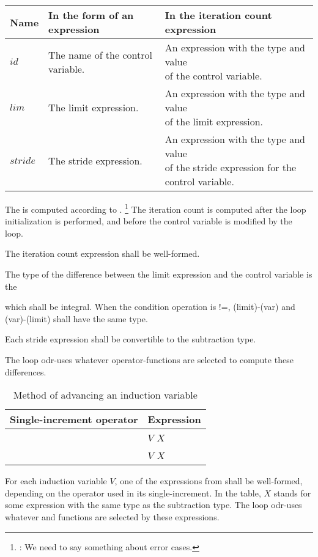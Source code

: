 \begin{table}[ht]
\begin{tabular}{|l|l|l|}
\hline
\bfseries Name&
\bfseries In the form of an expression&
\bfseries In the iteration count expression
\\ \hline
$id$&
The name of the control variable.&
\parbox[c][30pt]{2.5in}{
An expression with the type and value\\
of the control variable.
}
\\ \hline
$lim$&
The limit expression.&
\parbox[c][30pt]{2.5in}{
An expression with the type and value\\
of the limit expression.
}
\\ \hline
$stride$&
The stride expression.&
\parbox[c][40pt]{2.5in}{
An expression with the type and value\\
of the stride expression
for the control variable.
}
\\ \hline
\end{tabular}
\end{table}

\pnum
The
is computed according to
.%
\footnote{:
We need to say something about error cases.
}
The iteration count is computed after the loop initialization is performed,
and before the control variable is modified by the loop.
\begin{cpp}
The iteration count expression shall be well-formed.
\end{cpp}

\pnum
The type of the difference between the limit expression and the control variable
is the
%
\yescpp{,}
\begin{cpp}
which shall be integral.
When the condition operation is !=,
(limit)-(var) and (var)-(limit) shall have the same type.
\end{cpp}
Each stride expression shall be convertible to the subtraction type.
\begin{cpp}
The loop odr-uses whatever operator-functions are selected
to compute these differences.
\end{cpp}

\begin{cpp}

\begin{table}[ht]
\caption{%
Method of advancing an induction variable
}
\label{tab:inc}
\centering
\begin{tabular}{|l|l|}
\hline
\bfseries Single-increment operator&
\bfseries Expression
\\ \hline
\tcode{++ += +}&
$V$ \tcode{+=} $X$
\\ \hline
\tcode{-- -= -}&
$V$ \tcode{-=} $X$
\\ \hline
\end{tabular}
\end{table}

\pnum
For each induction variable
$V$,
one of the expressions from
shall be well-formed,
depending on the operator used in its single-increment.
In the table,
$X$
stands for some expression with the same type as the subtraction type.
The loop odr-uses whatever
and
functions are selected by these expressions.
\end{cpp}

